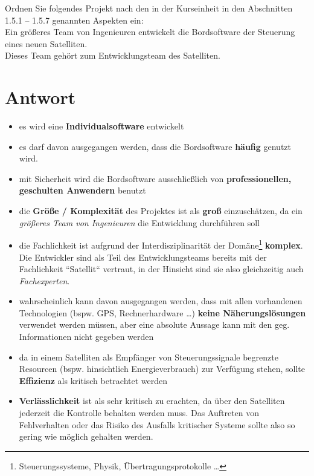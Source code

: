 Ordnen Sie folgendes Projekt nach den in der Kurseinheit in den Abschnitten 1.5.1 – 1.5.7 genannten Aspekten ein:\\

\noindent
Ein größeres Team von Ingenieuren entwickelt die Bordsoftware der Steuerung eines neuen Satelliten.\\
Dieses Team gehört zum Entwicklungsteam des Satelliten.


\section*{Antwort}

\begin{itemize}
    \item es wird eine \textbf{Individualsoftware} entwickelt
    \item es darf davon ausgegangen werden, dass die Bordsoftware \textbf{häufig} genutzt wird.
    \item mit Sicherheit wird die Bordsoftware ausschließlich von \textbf{professionellen, geschulten Anwendern} benutzt
    \item die \textbf{Größe / Komplexität} des Projektes ist als \textbf{groß} einzuschätzen, da ein \textit{größeres Team von Ingenieuren} die Entwicklung durchführen soll
    \item die Fachlichkeit ist aufgrund der Interdisziplinarität der Domäne\footnote{Steuerungssysteme, Physik, Übertragungsprotokolle \ldots} \textbf{komplex}.
    Die Entwickler sind als Teil des Entwicklungsteams bereits mit der Fachlichkeit ``Satellit`` vertraut, in der Hinsicht sind sie also gleichzeitig auch \textit{Fachexperten}.
    \item wahrscheinlich kann davon ausgegangen werden, dass mit allen vorhandenen Technologien (bspw. GPS, Rechnerhardware \ldots) \textbf{keine Näherungslösungen} verwendet werden müssen, aber eine absolute Aussage kann mit den geg. Informationen nicht gegeben werden
    \item da in einem Satelliten als Empfänger von Steuerungssignale begrenzte Resourcen (bspw. hinsichtlich Energieverbrauch) zur Verfügung stehen, sollte \textbf{Effizienz} als kritisch betrachtet werden
    \item \textbf{Verlässlichkeit} ist als sehr kritisch zu erachten, da über den Satelliten jederzeit die Kontrolle behalten werden muss.
    Das Auftreten von Fehlverhalten oder das Risiko des Ausfalls kritischer Systeme sollte also so gering wie möglich gehalten werden.
\end{itemize}
